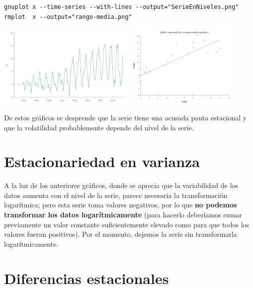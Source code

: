 \documentclass[10pt]{article}
\begin{document}
\begin{verbatim}
gnuplot x --time-series --with-lines --output="SerieEnNiveles.png"
rmplot  x --output="rango-media.png"
\end{verbatim}

\begin{center}
\includegraphics[width=0.5\textwidth]{./SegundoEjercicioIdentificacionARIMA/SerieEnNiveles.png}
\includegraphics[width=0.4\textwidth]{./SegundoEjercicioIdentificacionARIMA/rango-media.png} 
\end{center}

De estos gráficos se desprende que la serie tiene una acusada pauta
estacional y que la volatilidad probablemente depende del nivel de la
serie.
\section*{Estacionariedad en varianza}
\label{sec:org2f997d4}

A la luz de los anteriores gráficos, donde se aprecia que la
variabilidad de los datos aumenta con el nivel de la serie, parece
necesaria la transformación logarítmica; pero esta serie toma valores
negativos, por lo que \textbf{no podemos transformar los datos
logarítmicamente} (para hacerlo deberíamos sumar previamente un valor
constante suficientemente elevado como para que todos los valores
fueran positivos). Por el momento, dejemos la serie sin transformarla
logarítmicamente.
\section*{Diferencias estacionales}
\label{sec:org3beacc4}
\end{document}
